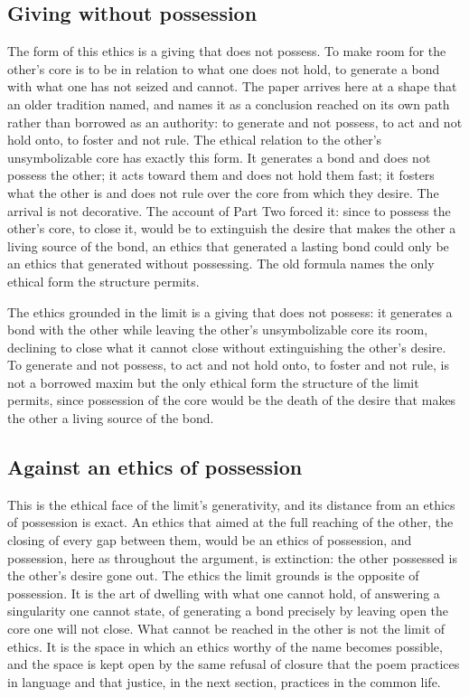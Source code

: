 \subsection*{Giving without possession}

The form of this ethics is a giving that does not possess. To make room for the other's core is to be in relation to what one does not hold, to generate a bond with what one has not seized and cannot. The paper arrives here at a shape that an older tradition named, and names it as a conclusion reached on its own path rather than borrowed as an authority: to generate and not possess, to act and not hold onto, to foster and not rule. The ethical relation to the other's unsymbolizable core has exactly this form. It generates a bond and does not possess the other; it acts toward them and does not hold them fast; it fosters what the other is and does not rule over the core from which they desire. The arrival is not decorative. The account of Part Two forced it: since to possess the other's core, to close it, would be to extinguish the desire that makes the other a living source of the bond, an ethics that generated a lasting bond could only be an ethics that generated without possessing. The old formula names the only ethical form the structure permits.

\begin{claim}
The ethics grounded in the limit is a giving that does not possess: it generates a bond with the other while leaving the other's unsymbolizable core its room, declining to close what it cannot close without extinguishing the other's desire. To generate and not possess, to act and not hold onto, to foster and not rule, is not a borrowed maxim but the only ethical form the structure of the limit permits, since possession of the core would be the death of the desire that makes the other a living source of the bond.
\end{claim}

\subsection*{Against an ethics of possession}

This is the ethical face of the limit's generativity, and its distance from an ethics of possession is exact. An ethics that aimed at the full reaching of the other, the closing of every gap between them, would be an ethics of possession, and possession, here as throughout the argument, is extinction: the other possessed is the other's desire gone out. The ethics the limit grounds is the opposite of possession. It is the art of dwelling with what one cannot hold, of answering a singularity one cannot state, of generating a bond precisely by leaving open the core one will not close. What cannot be reached in the other is not the limit of ethics. It is the space in which an ethics worthy of the name becomes possible, and the space is kept open by the same refusal of closure that the poem practices in language and that justice, in the next section, practices in the common life.
